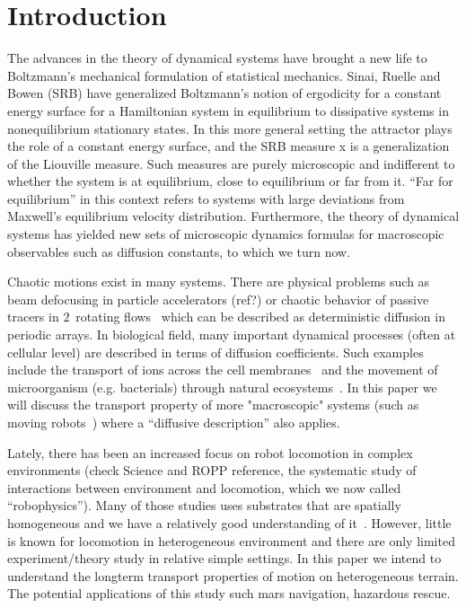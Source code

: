 \documentclass[aps,pre,preprint,groupedaddress,floatfix]{revtex4-1}
\begin{document}
\section{Introduction}

The advances in the theory of dynamical systems have brought a new life to Boltzmann's mechanical formulation of statistical mechanics. Sinai, Ruelle and Bowen (SRB) have generalized Boltzmann's notion of ergodicity for a constant energy surface for a Hamiltonian system in equilibrium to dissipative systems in {nonequilibrium} stationary states. In this more general setting the attractor plays the role of a constant energy surface, and the SRB measure x is a generalization of the Liouville measure. Such measures are purely microscopic and indifferent to whether the system is at equilibrium, close to equilibrium or far from it. ``Far for equilibrium'' in this context refers to systems with large deviations from Maxwell's equilibrium velocity distribution. Furthermore, the theory of dynamical systems has yielded new sets of microscopic dynamics formulas for macroscopic observables such as diffusion constants, to which we turn now.

Chaotic motions exist in many systems. There are physical problems such as beam defocusing in particle accelerators (ref?) or chaotic behavior of passive tracers in $2$\dmn\ rotating flows~\cite{solomon1994chaotic} which can be described as deterministic diffusion in periodic arrays. In biological field, many important dynamical processes (often at cellular level) are described in terms of diffusion coefficients. Such examples include the transport of ions across the cell membranes~\cite{stein2012transport} and the movement of microorganism (e.g. bacterials) through natural ecosystems~\cite{koch1990diffusion}. In this paper we will discuss the transport property of more "macroscopic" systems (such as moving robots~\cite{saranli2001rhex}) where a ``diffusive description'' also applies. 

Lately, there has been an increased focus on robot locomotion in complex environments (check Science and ROPP reference, the systematic study of interactions between environment and locomotion, which we now called ``robophysics''). Many of those studies uses substrates that are spatially homogeneous and we have a relatively good understanding of it~\cite{li2009sensitive, li2013terradynamics}. However, little is known for locomotion in heterogeneous environment and there are only limited experiment/theory study in relative simple settings. In this paper we intend to understand the longterm transport properties of motion on heterogeneous terrain. The potential applications of this study such mars navigation, hazardous rescue.
\end{document}
